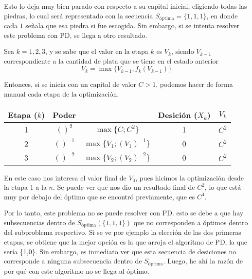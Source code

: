 \documentclass[letterpaper,10pt]{article}
\begin{document}
 Esto lo deja muy bien parado con respecto a su capital inicial, eligiendo todas las piedras, lo cual será representado con la secuencia  $S_{\text{óptima}}= \{1,1,1\}$, en donde cada $1$ señala que esa piedra si fue escogida. Sin embargo, si se intenta resolver este problema con PD, se llega a otro resultado. 
 
 Sea $k=1,2,3$, y se sabe que el valor en la etapa $k$ es $V_k$, siendo $V_{k-1}$ correspondiente a la cantidad de plata que se tiene en el estado anterior
 $$V_k = \max\{V_{k-1}, f_k(V_{k-1})\}$$ 

 
 Entonces, si se inicia con un capital de valor $C > 1$, podemos hacer de forma manual cada etapa de la optimización.
 \begin{center}
    \begin{tabular}{c|c|c|c|c}
      Etapa ($k$) & Poder &  & Desición ($X_k$) & $V_{k}$ \\\hline
      1 & $()^2 $ & $\max\{C; C^2\}$ & 1 & $C^2$ \\
      2 & $()^{-1} $ & $\max\{V_1; (V_1)^{-1}\}$ & 0 & $C^2$ \\
      3 & $()^{-2} $ & $\max\{V_2; (V_2)^{-2}\}$ & 0 & $C^2$ \\
    \end{tabular}
  \end{center}
  
  En este caso nos interesa el valor final de $V_3$, pues hicimos la optimización desde la etapa $1$ a la $n$. Se puede ver que nos dio un resultado final de $C^2$, lo que está muy por debajo del óptimo que se encontró previamente, que es $C^4$. 
  
  Por lo tanto, este problema no se puede resolver con PD. esto se debe a que hay subsecuencias dentro de $S_{\text{óptima}} (\{1,1,1\})$ que no corresponden a óptimos dentro del subproblema respectivo. Si se ve por ejemplo la elección de las dos primeras etapas, se obtiene que la mejor opción es la que arroja el algoritmo de PD, la que sería \{1,0\}. Sin embargo, es inmediato ver que esta secuencia de desiciones no corresponde a ninguna subsecuencia dentro de $S_{\text{óptima}}$. Luego, he ahí la razón de por qué con este algoritmo no se llega al óptimo.
  
  
\end{document}
